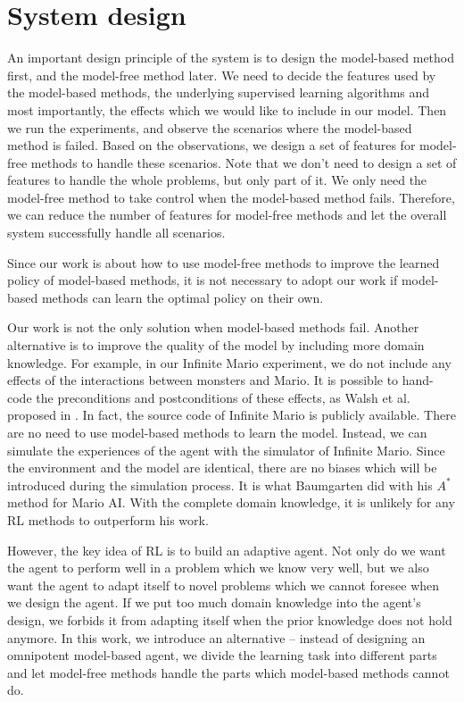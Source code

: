\section{System design}

An important design principle of the system is to design the model-based method first,
and the model-free method later. 
We need to decide the features used by the
model-based methods, the underlying supervised learning algorithms and most
importantly, the effects which we would like to include in our model. Then we
run the experiments, and observe the scenarios where the model-based method
is failed. 
Based on the observations, we design a set of features for model-free methods to handle
these scenarios. Note that we don't need to design a set of features to handle
the whole problems, but only part of it. We only need the model-free method
to take control when the model-based method fails. Therefore, we can reduce the
number of features for model-free methods and let the overall system
successfully handle all scenarios.

Since our work is about how to use model-free methods to improve the learned policy of model-based methods,
it is not necessary to adopt our work if model-based methods can learn the optimal policy
on their own.

Our work is not the only solution when model-based methods fail.
Another alternative is to improve the quality of the model by including more domain knowledge.
For example, in our Infinite Mario experiment, we do not include any effects 
of the interactions between monsters and Mario. It is possible to
hand-code the preconditions and postconditions of these effects, as Walsh et al. proposed in \cite{Walsh09}.
In fact, the source code of Infinite Mario is publicly available.
There are no need to use model-based methods to learn the model. Instead,
we can simulate the experiences of the agent with the simulator of Infinite Mario. 
Since the environment and the model are identical, there are no biases which will be 
introduced during the simulation process.
It is what Baumgarten did with his $A^*$ method for Mario AI\cite{Robin09}.
With the complete domain knowledge, it is unlikely for any RL methods to outperform his work.

However, the key idea of RL is to build an adaptive agent.
Not only do we want the agent to perform well in a problem which we know very well,
but we also want the agent to adapt itself to novel problems which we cannot foresee when we design the agent.
If we put too much domain knowledge into the agent's design, we forbids it from adapting 
itself when the prior knowledge does not hold anymore. 
In this work, we introduce an alternative -- instead of designing an omnipotent model-based agent, we
divide the learning task into different parts and let model-free methods handle the parts which model-based methods cannot do.

